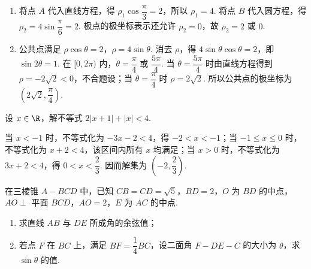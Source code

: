 \begin{solution}
\begin{enumerate}
\item 将点 \(A\) 代入直线方程，得 \(\rho_1\cos\dfrac\pi3=2\)，所以 \(\rho_1=4\). 将点 \(B\) 代入圆方程，得 \(\rho_2=4\sin\dfrac\pi6=2\). 极点的极坐标表示还允许 \(\rho_2=0\)，故 \(\rho_2=2\) 或 \(0\).
\item 公共点满足
\(\rho\cos\theta=2\)，\(\rho=4\sin\theta\).
消去 \(\rho\)，得 \(4\sin\theta\cos\theta=2\)，即 \(\sin2\theta=1\). 在 \([0,2\pi)\) 内，\(\theta=\dfrac\pi4\) 或 \(\dfrac{5\pi}4\). 当 \(\theta=\dfrac{5\pi}4\) 时由直线方程得到 \(\rho=-2\sqrt2<0\)，不合题设；当 \(\theta=\dfrac\pi4\) 时 \(\rho=2\sqrt2\). 所以公共点的极坐标为 \(\left(2\sqrt2,\dfrac\pi4\right)\).
\end{enumerate}
\end{solution}

\reuseproblemnumber
\begin{problem}[C]
设 \(x\in\R\)，解不等式 \(2\lvert x+1\rvert+\lvert x\rvert<4\).
\end{problem}

\begin{solution}
当 \(x<-1\) 时，不等式化为 \(-3x-2<4\)，得 \(-2<x<-1\)；当 \(-1\le x\le0\) 时，不等式化为 \(x+2<4\)，该区间内所有 \(x\) 均满足；当 \(x>0\) 时，不等式化为 \(3x+2<4\)，得 \(0<x<\dfrac23\). 因而解集为 \(\left(-2,\dfrac23\right)\).
\end{solution}

\begin{problem}
在三棱锥 \(A-BCD\) 中，已知 \(CB=CD=\sqrt5\)，\(BD=2\)，\(O\) 为 \(BD\) 的中点，\(AO\perp\) 平面 \(BCD\)，\(AO=2\)，\(E\) 为 \(AC\) 的中点.

\begin{enumerate}
\item 求直线 \(AB\) 与 \(DE\) 所成角的余弦值；
\item 若点 \(F\) 在 \(BC\) 上，满足 \(BF=\dfrac14BC\)，设二面角 \(F-DE-C\) 的大小为 \(\theta\)，求 \(\sin\theta\) 的值.
\end{enumerate}

\end{problem}

